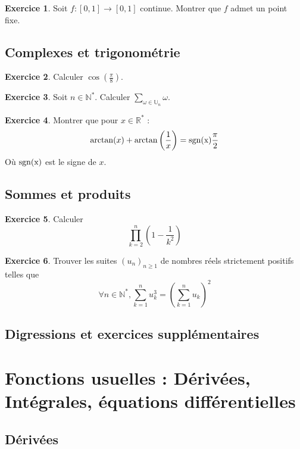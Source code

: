 \documentclass[12pt,a4paper]{book}
\theoremstyle{definition}
\newtheorem{exo}{Exercice}[section]
\theoremstyle{remark}
\newcommand{\N}{\mathbb{N}}
\newcommand{\R}{\mathbb{R}}
\newcommand{\U}{\mathbb{U}}
\begin{document}
\begin{exo}
    Soit $f : [0,1] \to [0,1]$ continue. Montrer que $f$ admet un point fixe.
\end{exo}

\section{Complexes et trigonométrie}

\begin{exo}
    Calculer $\cos\left(\frac{\pi}{8}\right)$.
\end{exo}

\begin{exo}
    Soit $n \in \N^*$. Calculer $\sum_{\omega \in \U_n} \omega$.
\end{exo}

\begin{exo}
    Montrer que pour $x \in \R^*$ :
    \[\arctan(x) + \arctan\left(\frac{1}{x}\right) = \rm{sgn}(x) \frac{\pi}{2}\]
    Où $\rm{sgn}(x)$ est le signe de $x$.
\end{exo}

\section{Sommes et produits}

\begin{exo}
    Calculer
    \[
    \prod_{k=2}^{n} \left( 1 - \frac{1}{k^2} \right)
    \]
\end{exo}

\begin{exo}
    Trouver les suites $(u_n)_{n\ge1}$ de nombres réels strictement positifs telles que
    \[
    \forall n \in \N^*, \sum_{k=1}^n u_k^3 = \left( \sum_{k=1}^n u_k \right)^2
    \]
\end{exo}

\section{Digressions et exercices supplémentaires}

\chapter{Fonctions usuelles : Dérivées, Intégrales, équations différentielles}

\section{Dérivées}
\end{document}
